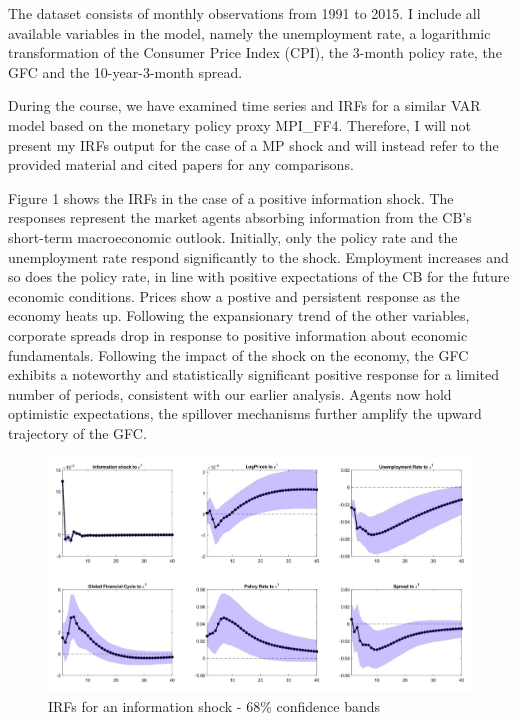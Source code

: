\documentclass[11pt,a4paper]{article}
\begin{document}
The dataset consists of monthly observations from 1991 to 2015. I include all available variables in the model, namely the unemployment rate, a logarithmic transformation of the Consumer Price Index (CPI), the 3-month policy rate, the GFC and the 10-year-3-month spread.

During the course, we have examined time series and IRFs for a similar VAR model based on the monetary policy proxy MPI\_FF4. Therefore, I will not present my IRFs output for the case of a MP shock and will instead refer to the provided material and cited papers for any comparisons.

Figure 1 shows the IRFs in the case of a positive information shock. The responses represent the market agents absorbing information from the CB's short-term macroeconomic outlook.
Initially, only the policy rate and the unemployment rate respond significantly to the shock. Employment increases and so does the policy rate, in line with positive expectations of the CB for the future economic conditions. Prices show a postive and persistent response as the economy heats up. Following the expansionary trend of the other variables, corporate spreads drop in response to positive information about economic fundamentals. 
Following the impact of the shock on the economy, the GFC exhibits a noteworthy and statistically significant positive response for a limited number of periods, consistent with our earlier analysis. Agents now hold optimistic expectations, the spillover mechanisms further amplify the upward trajectory of the GFC.


    \begin{figure}
        \centering
        \includegraphics[scale=.5]{Graphs/IRF68.jpeg}
        \caption{IRFs for an information shock - 68\% confidence bands}
        \label{fig:IRF68}
    \end{figure}
\end{document}
